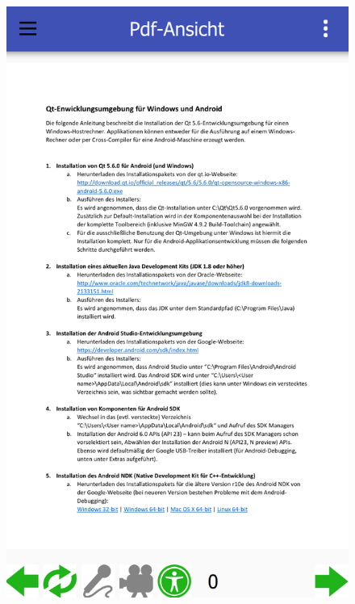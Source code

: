 \begin{figure}[ht!]
\begin{minipage}{0.31\linewidth}
		\includegraphics[scale=0.5]{GUI/Bilder/4_S_PDF-Ansicht.PNG}
	\end{minipage}
	\begin{minipage}{0.31\linewidth}
		\centering

\end{minipage}
\end{figure}
